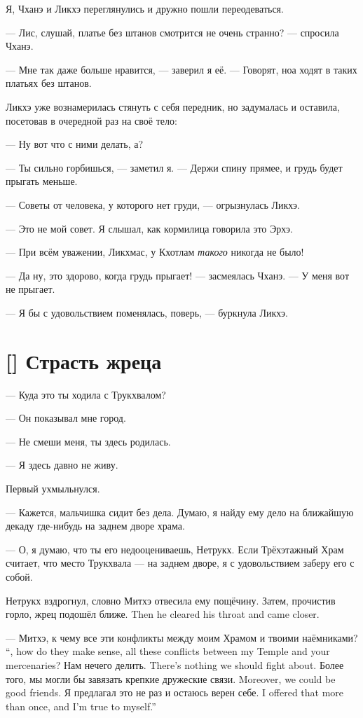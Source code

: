 Я, Чханэ и Ликхэ переглянулись и дружно пошли переодеваться.

--- Лис, слушай, платье без штанов смотрится не очень странно? --- спросила Чханэ.

--- Мне так даже больше нравится, --- заверил я её.
--- Говорят, ноа ходят в таких платьях без штанов.

Ликхэ уже вознамерилась стянуть с себя передник, но задумалась и оставила, посетовав в очередной раз на своё тело:

--- Ну вот что с ними делать, а?

--- Ты сильно горбишься, --- заметил я.
--- Держи спину прямее, и грудь будет прыгать меньше.

--- Советы от человека, у которого нет груди, --- огрызнулась Ликхэ.

--- Это не мой совет.
Я слышал, как кормилица говорила это Эрхэ.

--- При всём уважении, Ликхмас, у Кхотлам \emph{такого} никогда не было!

--- Да ну, это здорово, когда грудь прыгает! --- засмеялась Чханэ.
--- У меня вот не прыгает.

--- Я бы с удовольствием поменялась, поверь, --- буркнула Ликхэ.

\section{[] Страсть жреца}

\textspace

--- Куда это ты ходила с Трукхвалом?

--- Он показывал мне город.

--- Не смеши меня, ты здесь родилась.

--- Я здесь давно не живу.

Первый ухмыльнулся.

--- Кажется, мальчишка сидит без дела.
Думаю, я найду ему дело на ближайшую декаду где-нибудь на заднем дворе храма.

--- О, я думаю, что ты его недооцениваешь, Нетрукх.
Если Трёхэтажный Храм считает, что место Трукхвала --- на заднем дворе, я с удовольствием заберу его с собой.

Нетрукх вздрогнул, словно Митхэ отвесила ему пощёчину.
{Затем, прочистив горло, жрец подошёл ближе.}
{Then he cleared his throat and came closer.}

{--- Митхэ, к чему все эти конфликты между моим Храмом и твоими наёмниками?}
{``\Mitchoe, how do they make sense, all these conflicts between my Temple and your mercenaries?}
{Нам нечего делить.}
{There's nothing we should fight about.}
{Более того, мы могли бы завязать крепкие дружеские связи.}
{Moreover, we could be good friends.}
{Я предлагал это не раз и остаюсь верен себе.}
{I offered that more than once, and I'm true to myself.''}

